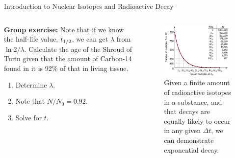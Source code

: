 \documentclass{beamer}
\begin{document}
\begin{frame}{Introduction to Nuclear Isotopes and Radioactive Decay}
\begin{columns}[T]
\begin{column}{0.5\textwidth}
\small
\textbf{Group exercise:} Note that if we know the half-life value, $t_{\rm 1/2}$, we can get $\lambda$ from $\ln 2/\lambda$. Calculate the age of the Shroud of Turin given that the amount of Carbon-14 found in it is 92\% of that in living tissue.
\begin{enumerate}
\item Determine $\lambda$.
\item Note that $N/N_0 = 0.92$.
\item Solve for $t$.
\end{enumerate}
\end{column}
\begin{column}{0.5\textwidth}
\begin{figure}
\centering
\includegraphics[width=0.95\textwidth]{figures/half-life.png}
\caption{\label{fig:radio8} Given a finite amount of radioactive isotopes in a substance, and that decays are equally likely to occur in any given $\Delta t$, we can demonstrate exponential decay.}
\end{figure}
\end{column}
\end{columns}
\end{frame}
\end{document}
